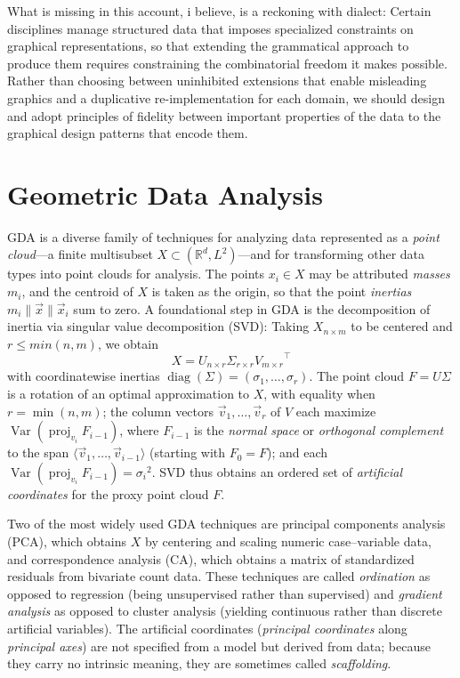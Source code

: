 \documentclass{vgtc}                          %
\newcommand{\R}{\mathbb{R}}
\newcommand{\diag}{\operatorname{diag}}
\newcommand{\Var}{\operatorname{Var}}
\newcommand{\proj}{\operatorname{proj}}
\begin{document}
What is missing in this account, i believe, is a reckoning with dialect:
Certain disciplines manage structured data that imposes specialized constraints on graphical representations, so that extending the grammatical approach to produce them requires constraining the combinatorial freedom it makes possible.
Rather than choosing between uninhibited extensions that enable misleading graphics and a duplicative re-implementation for each domain, we should design and adopt principles of fidelity between important properties of the data to the graphical design patterns that encode them.

\section{Geometric Data Analysis}

GDA is a diverse family of techniques for analyzing data represented as a \emph{point cloud}---a finite multisubset $X \subset (\R^d, L^2)$---and for transforming other data types into point clouds for analysis.
The points $x_i \in X$ may be attributed \emph{masses} $m_i$, and the centroid of $X$ is taken as the origin, so that the point \emph{inertias} $m_i \lVert \vec{x} \rVert \vec{x}_i$ sum to zero.
A foundational step in GDA is the decomposition of inertia via singular value decomposition (SVD):
Taking $X_{n \times m}$ to be centered and $r \leq min(n,m)$, we obtain
\[ X = U_{n \times r} \Sigma_{r \times r} {V_{m \times r}}^\top \]
with coordinatewise inertias $\diag(\Sigma) = (\sigma_1,\ldots,\sigma_r)$.
The point cloud $F = U\Sigma$ is a rotation of an optimal approximation to $X$, with equality when $r = \min(n,m)$; the column vectors $\vec{v}_1,\ldots,\vec{v}_r$ of $V$ each maximize $\Var(\proj_{v_i}F_{i-1})$, where $F_{i-1}$ is the \emph{normal space} or \emph{orthogonal complement} to the span $\langle \vec{v}_1, \ldots, \vec{v}_{i-1} \rangle$ (starting with $F_0 = F$); and each $\Var(\proj_{v_i}F_{i-1}) = {\sigma_i}^2$.
SVD thus obtains an ordered set of \emph{artificial coordinates} for the proxy point cloud $F$.

Two of the most widely used GDA techniques are principal components analysis (PCA), which obtains $X$ by centering and scaling numeric case--variable data, and correspondence analysis (CA), which obtains a matrix of standardized residuals from bivariate count data.
These techniques are called \emph{ordination} as opposed to regression (being unsupervised rather than supervised) and \emph{gradient analysis} as opposed to cluster analysis (yielding continuous rather than discrete artificial variables).
The artificial coordinates (\emph{principal coordinates} along \emph{principal axes}) are not specified from a model but derived from data; because they carry no intrinsic meaning, they are sometimes called \emph{scaffolding}.
\end{document}
